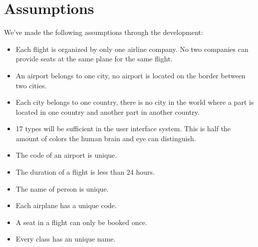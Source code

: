 
\section{Assumptions}
We've made the following assumptions through the development:
\begin{itemize}
 \item Each flight is organized by only one airline company. No two companies
can provide seats at the same plane for the same flight.
 \item An airport belongs to one city, no airport is located on the border
between two cities.
 \item Each city belongs to one country, there is no city in the world where a
part is located in one country and another part in another country.
 \item 17 types will be sufficient in the user interface system. This is half
the amount of colors the human brain and eye can distinguish.
\item The code of an airport is unique.
\item The duration of a flight is less than 24 hours.
\item The name of person is unique.
\item Each airplane has a unique code.
\item A seat in a flight can only be booked once.
\item Every class has an unique name.
\end{itemize}